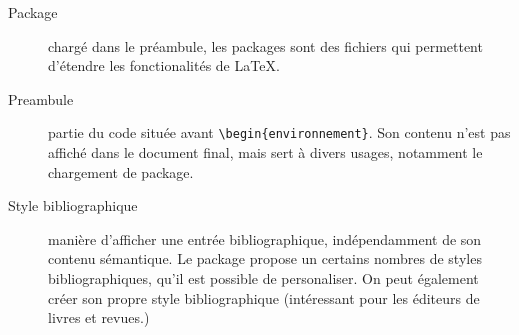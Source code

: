 \begin{description}
\item[Package]chargé dans le préambule, les packages sont des fichiers qui permettent d'étendre les fonctionalités  de \LaTeX.

\item[Preambule]partie du code  située avant \verb|\begin{environnement}|. Son contenu n'est pas affiché dans le document final, mais sert à divers usages, notamment le chargement de package.

\item[Style bibliographique]manière d'afficher une entrée bibliographique, indépendamment de son contenu sémantique. Le package  propose un certains nombres de styles bibliographiques, qu'il est possible de personaliser. On peut également créer son propre style bibliographique (intéressant pour les éditeurs de livres et revues.)
\end{description}
